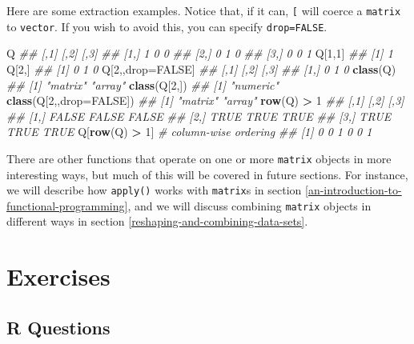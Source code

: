 \documentclass[12pt,krantz2]{krantz}
\makeatletter
\newenvironment{Shaded}{\begin{snugshade}}{\end{snugshade}}
\newcommand{\CommentTok}[1]{\textcolor[rgb]{0.37,0.37,0.37}{\textit{#1}}}
\newcommand{\DataTypeTok}[1]{\textcolor[rgb]{0.27,0.27,0.27}{#1}}
\newcommand{\DecValTok}[1]{\textcolor[rgb]{0.06,0.06,0.06}{#1}}
\newcommand{\KeywordTok}[1]{\textcolor[rgb]{0.27,0.27,0.27}{\textbf{#1}}}
\newcommand{\NormalTok}[1]{#1}
\newcommand{\OperatorTok}[1]{\textcolor[rgb]{0.43,0.43,0.43}{\textbf{#1}}}
\newcommand{\OtherTok}[1]{\textcolor[rgb]{0.37,0.37,0.37}{#1}}
\newcommand{\StringTok}[1]{\textcolor[rgb]{0.5,0.5,0.5}{#1}}
\newenvironment{kframe}{%
\medskip{}
\setlength{\fboxsep}{.8em}
 \def\at@end@of@kframe{}%
 \ifinner\ifhmode%
  \def\at@end@of@kframe{\end{minipage}}%
  \begin{minipage}{\columnwidth}%
 \fi\fi%
 \def\FrameCommand##1{\hskip\@totalleftmargin \hskip-\fboxsep
 \colorbox{shadecolor}{##1}\hskip-\fboxsep
     \hskip-\linewidth \hskip-\@totalleftmargin \hskip\columnwidth}%
 \MakeFramed {\advance\hsize-\width
   \@totalleftmargin\z@ \linewidth\hsize
   \@setminipage}}%
 {\par\unskip\endMakeFramed%
 \at@end@of@kframe}
\renewenvironment{Shaded}{\begin{kframe}}{\end{kframe}}
\makeatother
\begin{document}
Here are some extraction examples. Notice that, if it can, \texttt{{[}} will coerce a \texttt{matrix} to \texttt{vector}. If you wish to avoid this, you can specify \texttt{drop=FALSE}.

\begin{Shaded}
\begin{Highlighting}[]
\NormalTok{Q}
\CommentTok{##      [,1] [,2] [,3]}
\CommentTok{## [1,]    1    0    0}
\CommentTok{## [2,]    0    1    0}
\CommentTok{## [3,]    0    0    1}
\NormalTok{Q[}\DecValTok{1}\NormalTok{,}\DecValTok{1}\NormalTok{]}
\CommentTok{## [1] 1}
\NormalTok{Q[}\DecValTok{2}\NormalTok{,]}
\CommentTok{## [1] 0 1 0}
\NormalTok{Q[}\DecValTok{2}\NormalTok{,,drop=}\OtherTok{FALSE}\NormalTok{]}
\CommentTok{##      [,1] [,2] [,3]}
\CommentTok{## [1,]    0    1    0}
\KeywordTok{class}\NormalTok{(Q)}
\CommentTok{## [1] "matrix" "array"}
\KeywordTok{class}\NormalTok{(Q[}\DecValTok{2}\NormalTok{,])}
\CommentTok{## [1] "numeric"}
\KeywordTok{class}\NormalTok{(Q[}\DecValTok{2}\NormalTok{,,}\DataTypeTok{drop=}\OtherTok{FALSE}\NormalTok{])  }
\CommentTok{## [1] "matrix" "array"}
\KeywordTok{row}\NormalTok{(Q) }\OperatorTok{>}\StringTok{ }\DecValTok{1}
\CommentTok{##       [,1]  [,2]  [,3]}
\CommentTok{## [1,] FALSE FALSE FALSE}
\CommentTok{## [2,]  TRUE  TRUE  TRUE}
\CommentTok{## [3,]  TRUE  TRUE  TRUE}
\NormalTok{Q[}\KeywordTok{row}\NormalTok{(Q) }\OperatorTok{>}\StringTok{ }\DecValTok{1}\NormalTok{] }\CommentTok{# column-wise ordering}
\CommentTok{## [1] 0 0 1 0 0 1}
\end{Highlighting}
\end{Shaded}

There are other functions that operate on one or more \texttt{matrix} objects in more interesting ways, but much of this will be covered in future sections. For instance, we will describe how \texttt{apply()} works with \texttt{matrix}s in section \ref{an-introduction-to-functional-programming}, and we will discuss combining \texttt{matrix} objects in different ways in section \ref{reshaping-and-combining-data-sets}.

\hypertarget{exercises-2}{%
\section{Exercises}\label{exercises-2}}

\hypertarget{r-questions-2}{%
\subsection{R Questions}\label{r-questions-2}}
\end{document}
